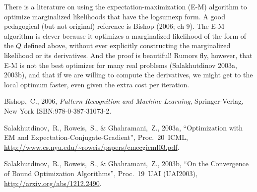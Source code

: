 \documentclass[12pt]{article}
\begin{document}
There is a literature on using the expectation-maximization (E-M)
algorithm to optimize marginalized likelihoods that have the logsumexp
form.
A good pedagogical (but not original) reference is Bishop (2006; ch
9).
The E-M algorithm is clever because it optimizes a marginalized
likelihood of the form of the $Q$ defined above, without ever
explicitly constructing the marginalized likelihood or its
derivatives.
And the proof is beautiful!
Rumors fly, however, that E-M is not the best optimizer for many
real problems (Salakhutdinov 2003a, 2003b), and that if we are willing
to compute the derivatives, we might get to the local optimum faster,
even given the extra cost per iteration.

\begin{trivlist}\raggedright
\item
Bishop,~C., 2006,
\textit{Pattern Recognition and Machine Learning},
Springer-Verlag, New York
{\footnotesize ISBN:978-0-387-31073-2}.
\item
Salakhutdinov,~R., Roweis,~S., \& Ghahramani,~Z., 2003a,
``Optimization with EM and Expectation-Conjugate-Gradient'',
Proc.~20~ICML,
{\footnotesize \url{http://www.cs.nyu.edu/~roweis/papers/emecgicml03.pdf}}.
\item
Salakhutdinov,~R., Roweis,~S., \& Ghahramani,~Z., 2003b,
``On the Convergence of Bound Optimization Algorithms'',
Proc.~19~UAI (UAI2003),
{\footnotesize \url{http://arxiv.org/abs/1212.2490}}.
\end{trivlist}
\end{document}
